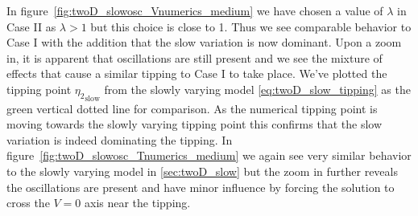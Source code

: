 In figure~\ref{fig:twoD_slowosc_Vnumerics_medium} we have chosen a value of $\lambda$ in Case II as $\lambda>1$ but this choice is close to 1. Thus we see comparable behavior to Case I with the addition that the slow variation is now dominant. Upon a zoom in, it is apparent that oscillations are still present and we see the mixture of effects that cause a similar tipping to Case I to take place. We've plotted the tipping point ${\eta_2}_{\text{slow}}$ from the slowly varying model \eqref{eq:twoD_slow_tipping} as the green vertical dotted line for comparison. As the numerical tipping point is moving towards the slowly varying tipping point this confirms that the slow variation is indeed dominating the tipping. In figure~\ref{fig:twoD_slowosc_Tnumerics_medium} we again see very similar behavior to the slowly varying model in \autoref{sec:twoD_slow} but the zoom in further reveals the oscillations are present and have minor influence by forcing the solution to cross the $V=0$ axis near the tipping.

